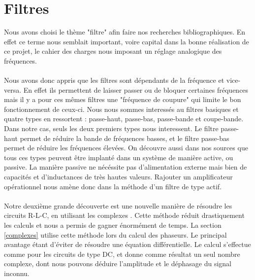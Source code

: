 \section{Filtres}
Nous avons choisi le thème "filtre" afin faire nos recherches bibliographiques. En effet ce terme nous semblait 
important, voire capital dans la bonne réalisation de ce projet, le cahier des charges nous imposant un réglage 
analogique des fréquences.

\paragraph{}
Nous avons donc appris que les filtres sont dépendants de la fréquence et vice-versa. En effet ils permettent de 
laisser passer ou de bloquer certaines fréquences mais il y a pour ces mêmes filtres une "fréquence de coupure" 
qui limite le bon fonctionnement de ceux-ci. Nous nous sommes interessés au filtres basiques et quatre types en 
ressortent : passe-haut, passe-bas, passe-bande et coupe-bande. Dans notre cas, seuls les deux premiers types nous 
interessent. Le filtre passe-haut permet de réduire la bande de fréquences basses, et le filtre passe-bas permet de 
réduire les fréquences élevées. On découvre aussi dans nos sources que tous ces types peuvent être implanté dans un 
système de manière active, ou passive. La manière passive ne nécéssite pas d'alimentation externe mais bien de 
capacités et d'inductances de très hautes valeurs. Rajouter un amplificateur opérationnel nous amène donc 
dans la méthode d'un filtre de type 
actif. \cite[p.~249-251]{Kularatna}

\paragraph{}
Notre deuxième grande découverte est une nouvelle manière de résoudre les circuits R-L-C, en utilisant les 
complexes \cite[p. 375-379]{Irwin}. Cette méthode réduit drastiquement les calculs et nous a permis de gagner 
énormément de temps. La section \ref{complexes} utilise cette méthode lors du calcul des phaseurs. Le principal 
avantage étant d'éviter de résoudre une équation différentielle. Le calcul s'effectue comme pour les circuits de 
type DC, et donne comme résultat un seul nombre complexe, dont nous pouvons déduire l'amplitude et le déphasage du 
signal inconnu.